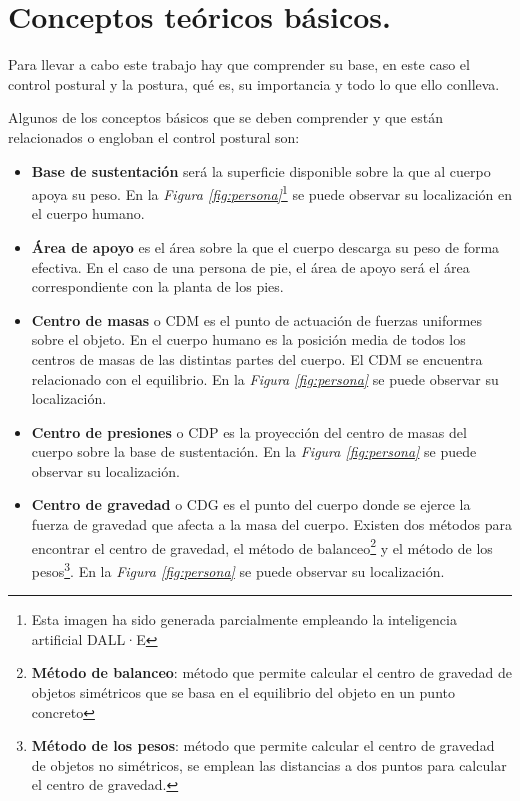 \section{Conceptos teóricos básicos.} 

Para llevar a cabo este trabajo hay que comprender su base, en este caso el control postural y la postura, qué es, su importancia y todo lo que ello conlleva.\cite{Libro1,Libro2} 

Algunos de los conceptos básicos que se deben comprender y que están relacionados o engloban el control postural son:

\begin{itemize}
    \item \textbf{Base de sustentación} será la superficie disponible sobre la que al cuerpo apoya su peso. En la \textit{Figura  \ref{fig:persona}}\footnote{Esta imagen ha sido generada parcialmente empleando la inteligencia artificial DALL·E} se puede observar su localización en el cuerpo humano.
    
    \item \textbf{Área de apoyo} es el área sobre la que el cuerpo descarga su peso de forma efectiva. En el caso de una persona de pie, el área de apoyo será el área correspondiente con la planta de los pies.
    
    \item \textbf{Centro de masas} \cite{CDM} o CDM es el punto de actuación de fuerzas uniformes sobre el objeto. En el cuerpo humano es la posición media de todos los centros de masas de las distintas partes del cuerpo. El CDM se encuentra relacionado con el equilibrio.  En la \textit{Figura \ref{fig:persona}} se puede observar su localización.
    
    \item \textbf{Centro de presiones} o CDP es la proyección del centro de masas del cuerpo sobre la base de sustentación. En la \textit{Figura \ref{fig:persona}} se puede observar su localización.
    
    \item \textbf{Centro de gravedad} o CDG es el punto del cuerpo donde se ejerce la fuerza de gravedad que afecta a la masa del cuerpo. Existen dos métodos para encontrar el centro de gravedad, el método de balanceo\footnote{\textbf{Método de balanceo}: método que permite calcular el centro de gravedad de objetos simétricos que se basa en el equilibrio del objeto en un punto concreto} y el método de los pesos\footnote{\textbf{Método de los pesos}: método que permite calcular el centro de gravedad de objetos no simétricos, se emplean las distancias a dos puntos para calcular el centro de gravedad.}. En la \textit{Figura \ref{fig:persona}} se puede observar su localización. 


\end{itemize}
